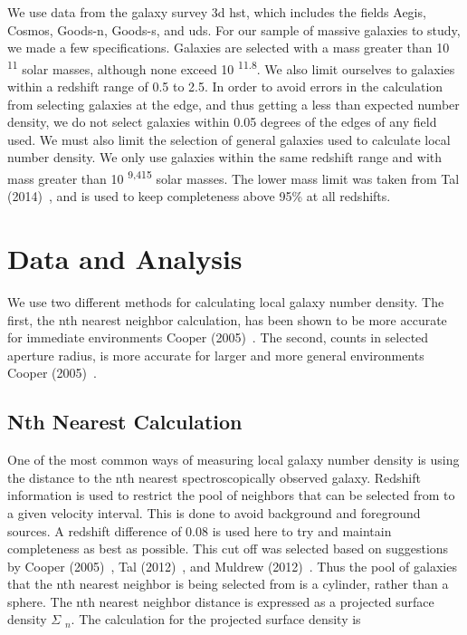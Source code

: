 \documentclass[apj]{emulateapj}
\begin{document}
We use data from the galaxy survey 3d hst, which includes the fields Aegis, Cosmos, Goods-n, Goods-s, and uds. For our sample of massive galaxies to study, we made a few specifications. Galaxies are selected with a mass greater than 10 \textsuperscript{11} solar masses, although none exceed 10 \textsuperscript{11.8}. We also limit ourselves to galaxies within a redshift range of 0.5 to 2.5. In order to avoid errors in the calculation from selecting galaxies at the edge, and thus getting a less than expected number density, we do not select galaxies within 0.05 degrees of the edges of any field used.
We must also limit the selection of general galaxies used to calculate local number density. We only use galaxies within the same redshift range and with mass greater than 10 \textsuperscript{9,415} solar masses. The lower mass limit was taken from Tal (2014)~\cite{2014ApJ...789..164T}, and is used to keep completeness above 95\% at all redshifts.

\section{Data and Analysis}

We use two different methods for calculating local galaxy number density. The first, the nth nearest neighbor calculation, has been shown to be more accurate for immediate environments Cooper (2005)~\cite{2005ApJ...634..833C}. The second, counts in selected aperture radius, is more accurate for larger and more general environments Cooper (2005)~\cite{2005ApJ...634..833C}.

\subsection{Nth Nearest Calculation}

One of the most common ways of measuring local galaxy number density is using the distance to the nth nearest spectroscopically observed galaxy. Redshift information is used to restrict the pool of neighbors that can be selected from to a given velocity interval. This is done to avoid background and foreground sources. A redshift difference of 0.08 is used here to try and maintain completeness as best as possible. This cut off was selected based on suggestions by Cooper (2005)~\cite{2005ApJ...634..833C}, Tal (2012)~\cite{2012ApJ...751L...5T}, and Muldrew (2012)~\cite{2012MNRAS.419.2670M}. Thus the pool of galaxies that the nth nearest neighbor is being selected from is a cylinder, rather than a sphere. The nth nearest neighbor distance is expressed as a projected surface density $\Sigma$ $_{n}$. The calculation for the projected surface density is
\end{document}

